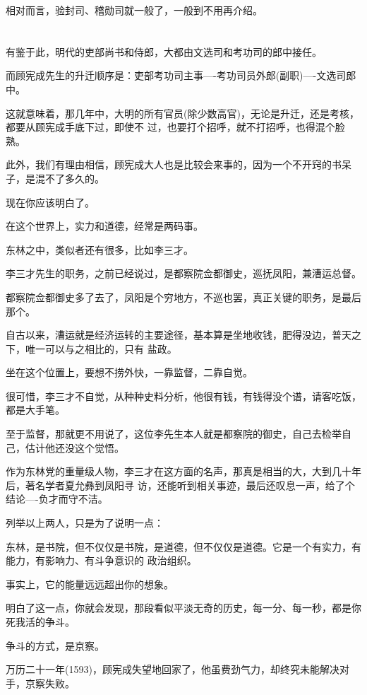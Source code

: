 \documentclass[11pt,a4paper,onecolumn]{article}
\begin{document}
相对而言，验封司、稽勋司就一般了，一般到不用再介绍。

\section[\thesection]{}

有鉴于此，明代的吏部尚书和侍郎，大都由文选司和考功司的郎中接任。

而顾宪成先生的升迁顺序是：吏部考功司主事----考功司员外郎(副职)----文选司郎中。

这就意味着，那几年中，大明的所有官员(除少数高官)，无论是升迁，还是考核，都要从顾宪成手底下过，即使不
过，也要打个招呼，就不打招呼，也得混个脸熟。

此外，我们有理由相信，顾宪成大人也是比较会来事的，因为一个不开窍的书呆子，是混不了多久的。

现在你应该明白了。

在这个世界上，实力和道德，经常是两码事。

东林之中，类似者还有很多，比如李三才。

李三才先生的职务，之前已经说过，是都察院佥都御史，巡抚凤阳，兼漕运总督。

都察院佥都御史多了去了，凤阳是个穷地方，不巡也罢，真正关键的职务，是最后那个。

自古以来，漕运就是经济运转的主要途径，基本算是坐地收钱，肥得没边，普天之下，唯一可以与之相比的，只有
盐政。

坐在这个位置上，要想不捞外快，一靠监督，二靠自觉。

很可惜，李三才不自觉，从种种史料分析，他很有钱，有钱得没个谱，请客吃饭，都是大手笔。

至于监督，那就更不用说了，这位李先生本人就是都察院的御史，自己去检举自己，估计他还没这个觉悟。

作为东林党的重量级人物，李三才在这方面的名声，那真是相当的大，大到几十年后，著名学者夏允彝到凤阳寻
访，还能听到相关事迹，最后还叹息一声，给了个结论----负才而守不洁。

列举以上两人，只是为了说明一点：

东林，是书院，但不仅仅是书院，是道德，但不仅仅是道德。它是一个有实力，有能力，有影响力、有斗争意识的
政治组织。

事实上，它的能量远远超出你的想象。

明白了这一点，你就会发现，那段看似平淡无奇的历史，每一分、每一秒，都是你死我活的争斗。

争斗的方式，是京察。

万历二十一年(1593)，顾宪成失望地回家了，他虽费劲气力，却终究未能解决对手，京察失败。
\end{document}
